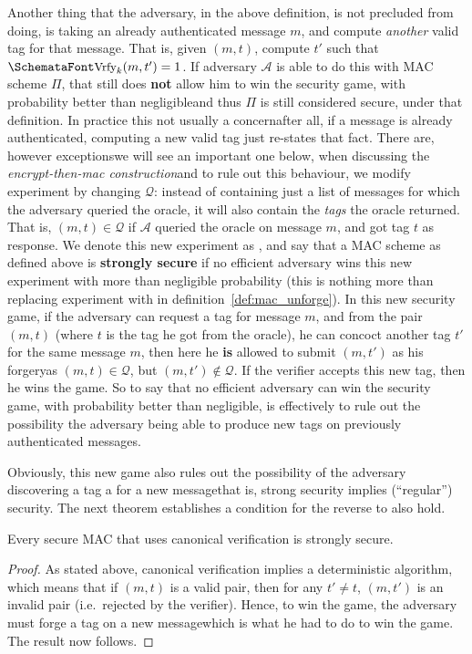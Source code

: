   \bigskip

   Another thing that the adversary, in the above definition, is not precluded from doing, is taking an already authenticated message $m$, and compute \emph{another} valid tag for that message. That is, given $(m, t)$, compute $t'$ such that $\myemph{Vrfy}_k(m, t') = 1$. If adversary $\mathcal{A}$ is able to do this with MAC scheme $\Pi$, that still does \textbf{not} allow him to win the  security game, with probability better than negligible\emd and thus $\Pi$ is still considered secure, under that definition. In practice this not usually a concern\emd after all, if a message is already authenticated, computing a new valid tag just re-states that fact. There are, however exceptions\emd we will see an important one below, when discussing the \emph{encrypt-then-mac construction}\emd and to rule out this behaviour, we modify experiment  by changing $\mathcal{Q}$: instead of containing just a list of messages for which the adversary queried the oracle, it will also contain the \emph{tags} the oracle returned. That is, $(m, t)\in \mathcal{Q}$ if $\mathcal{A}$ queried the oracle on message $m$, and got tag $t$ as response. We denote this new experiment as , and say that a MAC scheme as defined above is \textbf{strongly secure} if no efficient adversary wins this new experiment with more than negligible probability (this is nothing more than replacing experiment  with  in definition~\ref{def:mac_unforge}). In this new security game, if the adversary can request a tag for message $m$, and from the pair $(m, t)$ (where $t$ is the tag he got from the oracle), he can concoct another tag $t'$ for the same message $m$, then here he \textbf{is} allowed to submit $(m, t')$ as his forgery\emd as $(m, t)\in \mathcal{Q}$, but $(m, t')\not\in \mathcal{Q}$. If the verifier accepts this new tag, then he wins the game. So to say that no efficient adversary can win the  security game, with probability better than negligible, is effectively to rule out the possibility the adversary being able to produce new tags on previously authenticated messages.

  \bigskip

  \noindent Obviously, this new game  also rules out the possibility of the adversary discovering a tag a for a new message\emd that is, strong security implies (``regular'') security. The next theorem establishes a condition for the reverse to also hold.
  \begin{theorem}
    \label{thm:mac_strong_canonical}
    Every secure MAC that uses canonical verification is strongly secure.
  \end{theorem}
  \begin{proof}
    As stated above, canonical verification implies a deterministic  algorithm, which means that if $(m, t)$ is a valid pair, then for any $t'\neq t$, $(m, t')$ is an invalid pair (i.e.\ rejected by the verifier). Hence, to win the  game, the adversary must forge a tag on a new message\emd which is what he had to do to win the  game. The result now follows.
  \end{proof}

